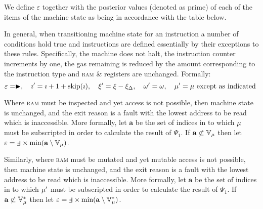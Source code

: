 We define $\varepsilon$ together with the posterior values (denoted as prime) of each of the items of the machine state as being in accordance with the table below.


In general, when transitioning machine state for an instruction a number of conditions hold true and instructions are defined essentially by their exceptions to these rules. Specifically, the machine does not halt, the instruction counter increments by one, the gas remaining is reduced by the amount corresponding to the instruction type and \textsc{ram} \& registers are unchanged. Formally:
\begin{equation}
  \varepsilon = \blacktriangleright,\quad \imath' = \imath + 1 + \text{skip}(\imath),\quad \xi' = \xi - \xi_\Delta,\quad \omega' = \omega,\quad{\mu}' = {\mu} \text{ except as indicated }
\end{equation}

Where \textsc{ram} must be inspected and yet access is not possible, then machine state is unchanged, and the exit reason is a fault with the lowest address to be read which is inaccessible. More formally, let $\mathbf{a}$ be the set of indices in to which ${\mu}$ must be subscripted in order to calculate the result of $\Psi_1$. If $\mathbf{a} \not\subset \mathbb{V}_{\mu}$ then let $\varepsilon=\fault \times \text{min}(\mathbf{a} \setminus \mathbb{V}_\mem)$.

Similarly, where \textsc{ram} must be mutated and yet mutable access is not possible, then machine state is unchanged, and the exit reason is a fault with the lowest address to be read which is inaccessible. More formally, let $\mathbf{a}$ be the set of indices in to which ${\mu}'$ must be subscripted in order to calculate the result of $\Psi_1$. If $\mathbf{a} \not\subset \mathbb{V}^*_{\mu}$ then let $\varepsilon=\fault \times \text{min}(\mathbf{a} \setminus \mathbb{V}^*_\mem)$.

